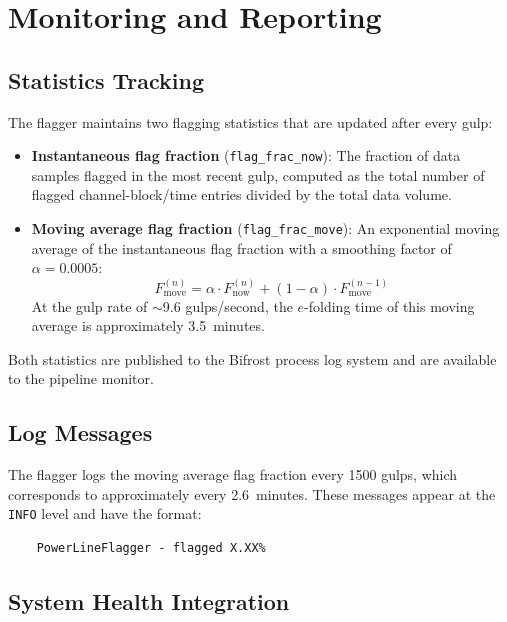 \section{Monitoring and Reporting}

\subsection{Statistics Tracking}

The flagger maintains two flagging statistics that are updated after every gulp:

\begin{itemize}
    \item \textbf{Instantaneous flag fraction} (\texttt{flag\_frac\_now}): The fraction of data samples flagged in the most recent gulp, computed as the total number of flagged channel-block/time entries divided by the total data volume.
    \item \textbf{Moving average flag fraction} (\texttt{flag\_frac\_move}): An exponential moving average of the instantaneous flag fraction with a smoothing factor of $\alpha = 0.0005$:
    \begin{equation}
        F_\mathrm{move}^{(n)} = \alpha \cdot F_\mathrm{now}^{(n)} + (1 - \alpha) \cdot F_\mathrm{move}^{(n-1)}
    \end{equation}
    At the gulp rate of $\sim$9.6 gulps/second, the $e$-folding time of this moving average is approximately 3.5~minutes.
\end{itemize}

Both statistics are published to the Bifrost process log system and are available to the pipeline monitor.

\subsection{Log Messages}

The flagger logs the moving average flag fraction every 1500 gulps, which corresponds to approximately every 2.6~minutes. These messages appear at the \texttt{INFO} level and have the format:

\begin{verbatim}
    PowerLineFlagger - flagged X.XX%
\end{verbatim}

\subsection{System Health Integration}

